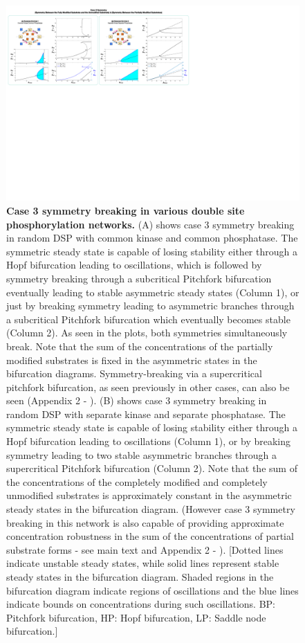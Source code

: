 \documentclass[9pt,lineno]{elife}
\begin{document}
\begin{figure}[h!]
    \begin{fullwidth}
    \centering
    \includegraphics[angle = 0, width = 0.85\paperwidth, keepaspectratio]{Fig03.pdf}
    \caption{\textbf{Case 3 symmetry breaking in various double site phosphorylation networks.}
    (A) shows case 3 symmetry breaking in random DSP with common kinase and common phosphatase. The symmetric steady state is capable of losing stability either through a Hopf bifurcation leading to oscillations, which is followed by symmetry breaking through a subcritical Pitchfork bifurcation eventually leading to stable asymmetric steady states (Column 1), or just by breaking symmetry leading to asymmetric branches through a subcritical Pitchfork bifurcation which eventually becomes stable (Column 2). As seen in the plots, both symmetries simultaneously break. Note that the sum of the concentrations of the partially modified substrates is fixed in the asymmetric states in the bifurcation diagrams.
    Symmetry-breaking via a supercritical pitchfork bifurcation, as seen previously in other cases, can also be seen (Appendix 2 - ).
    (B) shows case 3 symmetry breaking in random DSP with separate kinase and separate phosphatase. The symmetric steady state is capable of losing stability either through a Hopf bifurcation leading to oscillations (Column 1), or by breaking symmetry leading to two stable asymmetric branches through a supercritical Pitchfork bifurcation (Column 2). Note that the sum of the concentrations of the completely modified and completely unmodified substrates is approximately constant in the asymmetric steady states in the bifurcation diagram. (However case 3 symmetry breaking in this network is also capable of providing approximate concentration robustness in the sum of the concentrations of partial substrate forms - see main text and Appendix 2 - ).
    [Dotted lines indicate unstable steady states, while solid lines represent stable steady states in the bifurcation diagram. Shaded regions in the bifurcation diagram indicate regions of oscillations and the blue lines indicate bounds on concentrations during such oscillations. BP: Pitchfork bifurcation, HP: Hopf bifurcation, LP: Saddle node bifurcation.]}
    \label{Fig 3}
    \end{fullwidth}
\end{figure}
\end{document}
